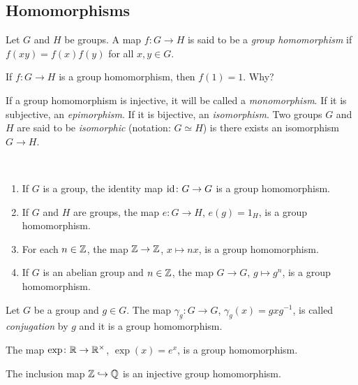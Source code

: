 \subsection{Homomorphisms}

\begin{definition}
        Let $G$ and $H$ be groups. 
        A map $f\colon G\to H$ is said to be a 
        \emph{group homomorphism} if 
        $f(xy)=f(x)f(y)$ for all $x,y\in G$.
\end{definition}

If $f\colon G\to H$ is a group homomorphism, 
then $f(1)=1$. Why? 

If a group homomorphism is injective, it will be called
a \emph{monomorphism}. If it is subjective, 
an \emph{epimorphism}. If it is bijective, 
an \emph{isomorphism}. Two groups $G$ and $H$ 
are said to be \emph{isomorphic} (notation: $G\simeq H$)
is there exists an isomorphism $G\to H$.

\begin{example}\
\begin{enumerate}
\item If $G$ is a group, the identity map $\operatorname{id}\colon G\to G$ is a group
homomorphism. 
\item If $G$ and $H$ are groups, the map $e\colon G\to H$, $e(g)=1_H$,  is a group homomorphism. 
\item For each $n\in\mathbb{Z}$, the map $\mathbb{Z}\to\mathbb{Z}$, $x\mapsto nx$, is a group homomorphism. 
\item If $G$ is an abelian group and $n\in\mathbb{Z}$, the map $G\to G$, $g\mapsto g^n$, is a group
homomorphism. 
\end{enumerate}
\end{example}

\begin{example}
Let $G$ be a group and $g\in G$. The map $\gamma_g\colon G\to G$, $\gamma_g(x)=gxg^{-1}$, is called 
\emph{conjugation} by $g$ and it is a group homomorphism. 
\end{example}

\begin{example}
The map $\exp\colon\mathbb{R}\to\mathbb{R}^\times$, $\exp(x)=e^x$, is a group homomorphism. 
\end{example}

\begin{example}
The inclusion map $\mathbb{Z}\hookrightarrow\mathbb{Q}$ is an injective group homomorphism. 
\end{example}

